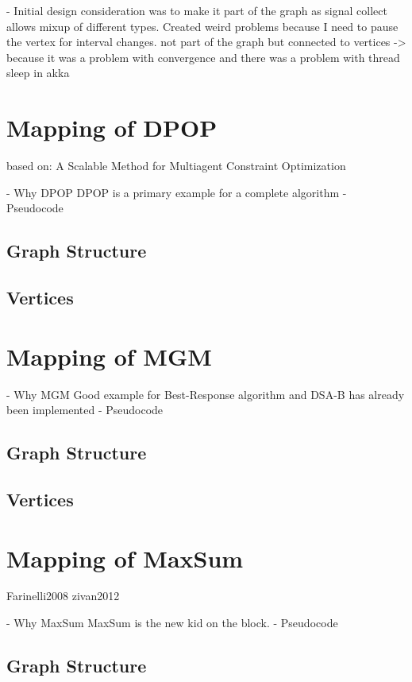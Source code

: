 - Initial design consideration was to make it part of the graph as signal collect allows mixup of different types. Created weird problems because I need to pause the vertex for interval changes. not part of the graph but connected to vertices -> because it was a problem with convergence and there was a problem with thread sleep in akka

\section{Mapping of DPOP}

based on: A Scalable Method for Multiagent Constraint Optimization
    
    - Why DPOP
    DPOP is a primary example for a complete algorithm
    - Pseudocode

\subsection{Graph Structure}
\subsection{Vertices}

\section{Mapping of MGM}



     - Why MGM
     Good example for Best-Response algorithm and DSA-B has already been implemented
    - Pseudocode

\subsection{Graph Structure}
\subsection{Vertices}

\section{Mapping of MaxSum}

\cite{Yedidsion}
Farinelli2008
zivan2012
    
    - Why MaxSum
    MaxSum is the new kid on the block.
    - Pseudocode

\subsection{Graph Structure}

